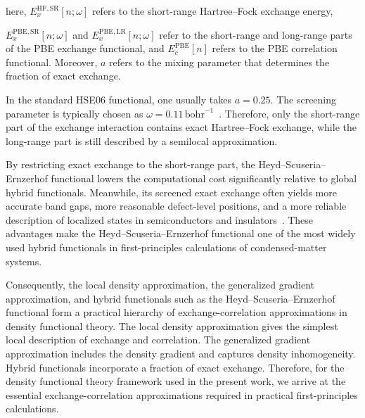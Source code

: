 here, $E_x^{\mathrm{HF},\mathrm{SR}}[n;\omega]$ refers to the short-range Hartree--Fock exchange energy,

$E_x^{\mathrm{PBE},\mathrm{SR}}[n;\omega]$ and $E_x^{\mathrm{PBE},\mathrm{LR}}[n;\omega]$ refer to the short-range and long-range parts of the PBE exchange functional,
and $E_c^\mathrm{PBE}[n]$ refers to the PBE correlation functional.
Moreover, $a$ refers to the mixing parameter that determines the fraction of exact exchange.

In the standard HSE06 functional,
one usually takes $a=0.25$.
The screening parameter is typically chosen as $\omega=0.11\,\mathrm{bohr}^{-1}$~\cite{krukau2006influence}.
Therefore, only the short-range part of the exchange interaction contains exact Hartree--Fock exchange,
while the long-range part is still described by a semilocal approximation.

By restricting exact exchange to the short-range part,
the Heyd--Scuseria--Ernzerhof functional lowers the computational cost significantly relative to global hybrid functionals.
Meanwhile, its screened exact exchange often yields more accurate band gaps,
more reasonable defect-level positions,
and a more reliable description of localized states in semiconductors and insulators~\cite{paier2006screened,krukau2006influence}.
These advantages make the Heyd--Scuseria--Ernzerhof functional one of the most widely used hybrid functionals in first-principles calculations of condensed-matter systems.

Consequently, the local density approximation,
the generalized gradient approximation,
and hybrid functionals such as the Heyd--Scuseria--Ernzerhof functional form a practical hierarchy of exchange-correlation approximations in density functional theory.
The local density approximation gives the simplest local description of exchange and correlation.
The generalized gradient approximation includes the density gradient and captures density inhomogeneity.
Hybrid functionals incorporate a fraction of exact exchange.
Therefore, for the density functional theory framework used in the present work,
we arrive at the essential exchange-correlation approximations required in practical first-principles calculations.




